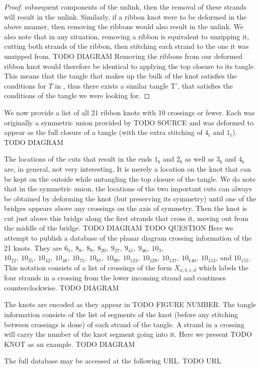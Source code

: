 \begin{paper}
\begin{proof}
subsequent components of the unlink, then the removal of these strands will
result in the unlink.
Similarly, if a ribbon knot were to be deformed in the above manner, then
removing the ribbons would also result in the unlink.
We also note that in any situation, removing a ribbon is equivalent to unzipping
it, cutting both strands of the ribbon, then stitching each strand to the one it
was unzipped from.
TODO DIAGRAM
Removing the ribbons from our deformed ribbon knot would therefore be identical
to applying the top closure to its tangle.
This means that the tangle that makes up the bulk of the knot satisfies the
conditions for $T$ in \lemtangles, thus there exists a similar tangle T', that
satisfies the conditions of the tangle we were looking for.
\end{proof}
We now provide a list of all 21 ribbon knots with 10 crossings or fewer.
Each was originally a symmetric union provided by TODO SOURCE and was deformed
to appear as the full closure of a tangle (with the extra stitching of $4_t$ and
$1_t$).
TODO DIAGRAM

The locations of the cuts that result in the ends $1_b$ and $2_b$ as well as
$3_b$ and $4_b$ are, in general, not very interesting.
It is merely a location on the knot that can be kept on the outside while
untangling the top closure of the tangle.
We do note that in the symmetric union, the locations of the two important cuts
can always be obtained by deforming the knot (but preserving its symmetry) until
one of the bridges appears above any crossings on the axis of symmetry.
Then the knot is cut just above this bridge along the first strands that cross
it, moving out from the middle of the bridge.
TODO DIAGRAM
TODO QUESTION
Here we attempt to publish a database of the planar diagram crossing information
of the 21 knots.
They are $6_1,~8_8,~8_9,~8_{20},~9_{27},~9_{41},~9_{46},~10_3$,
$10_{22},~10_{35},~10_{42},~10_{48},~10_{75},~10_{87},~10_{99}$,
$10_{123},~10_{129},~10_{137},~10_{140},~10_{153}$, and $10_{155}$.
This notation consists of a list of crossings of the form $X_{a,b,c,d}$ which
labels the four strands in a crossing from the lower incoming strand and
continues counterclockwise.
TODO DIAGRAM

The knots are encoded as they appear in TODO FIGURE NUMBER.
The tangle information consists of the list of segments of the knot (before any
stitching between crossings is done) of each strand of the tangle.
A strand in a crossing will carry the number of the knot segment going into it.
Here we present TODO KNOT as an example.
TODO DIAGRAM

The full database may be accessed at the following URL.
TODO URL
\end{paper}

